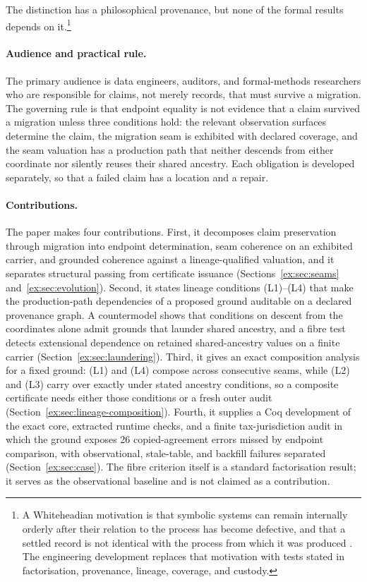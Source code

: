 \documentclass[twocolumn,envcountsect,envcountsame,natbib]{svjour3}
\begin{document}
The distinction has a philosophical provenance, but none of the formal results depends on it.\footnote{A Whiteheadian motivation is that symbolic systems can remain internally orderly after their relation to the process has become defective, and that a settled record is not identical with the process from which it was produced \citep{whitehead1927symbolism,whitehead1929}. The engineering development replaces that motivation with tests stated in factorisation, provenance, lineage, coverage, and custody.}

\paragraph{Audience and practical rule.} The primary audience is data engineers, auditors, and formal-methods researchers who are responsible for claims, not merely records, that must survive a migration. The governing rule is that endpoint equality is not evidence that a claim survived a migration unless three conditions hold: the relevant observation surfaces determine the claim, the migration seam is exhibited with declared coverage, and the seam valuation has a production path that neither descends from either coordinate nor silently reuses their shared ancestry. Each obligation is developed separately, so that a failed claim has a location and a repair.

\paragraph{Contributions.} The paper makes four contributions. First, it decomposes claim preservation through migration into endpoint determination, seam coherence on an exhibited carrier, and grounded coherence against a lineage-qualified valuation, and it separates structural passing from certificate issuance (Sections~\ref{ex:sec:seams} and~\ref{ex:sec:evolution}). Second, it states lineage conditions (L1)--(L4) that make the production-path dependencies of a proposed ground auditable on a declared provenance graph. A countermodel shows that conditions on descent from the coordinates alone admit grounds that launder shared ancestry, and a fibre test detects extensional dependence on retained shared-ancestry values on a finite carrier (Section~\ref{ex:sec:laundering}). Third, it gives an exact composition analysis for a fixed ground: (L1) and (L4) compose across consecutive seams, while (L2) and (L3) carry over exactly under stated ancestry conditions, so a composite certificate needs either those conditions or a fresh outer audit (Section~\ref{ex:sec:lineage-composition}). Fourth, it supplies a Coq development of the exact core, extracted runtime checks, and a finite tax-jurisdiction audit in which the ground exposes 26 copied-agreement errors missed by endpoint comparison, with observational, stale-table, and backfill failures separated (Section~\ref{ex:sec:case}). The fibre criterion itself is a standard factorisation result; it serves as the observational baseline and is not claimed as a contribution.
\end{document}
